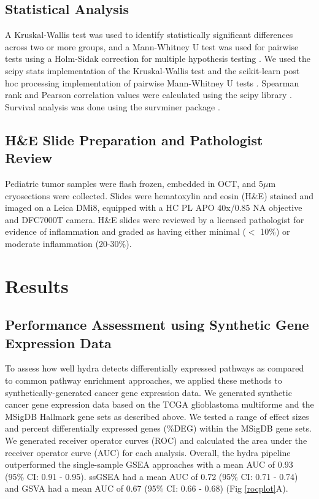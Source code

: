\documentclass[10pt,letterpaper]{article}
\begin{document}
\subsection*{Statistical Analysis}
A Kruskal-Wallis test was used to identify statistically significant differences across two or more groups, and a Mann-Whitney U test was used for pairwise tests using a Holm-Sidak correction for multiple hypothesis testing \cite{pedregosa2011scikit,jonesSciPyOpenSource2001}. We used the scipy \cite{2019arXiv190710121V} stats implementation of the Kruskal-Wallis test and the scikit-learn post hoc processing \cite{Terpilowski2019} implementation of pairwise Mann-Whitney U tests . Spearman rank and Pearson correlation values were calculated using the scipy library \cite{jonesSciPyOpenSource2001}. Survival analysis was done using the survminer package \cite{kassambaraSurvminerDrawingSurvival2019}. 

\subsection*{H\&E Slide Preparation and Pathologist Review}
Pediatric tumor samples were flash frozen, embedded in OCT, and 5$\mu$m cryosections were collected. Slides were hematoxylin and eosin (H\&E) stained and imaged on a Leica DMi8, equipped with a HC PL APO 40x/0.85 NA objective and DFC7000T camera. H\&E slides were reviewed by a licensed pathologist for evidence of inflammation and graded as having either minimal ($<$ 10\%) or moderate inflammation (20-30\%).

\section*{Results}
\subsection*{Performance Assessment using Synthetic Gene Expression Data}
To assess how well hydra detects differentially expressed pathways as compared to common pathway enrichment approaches, we applied these methods to synthetically-generated cancer gene expression data. We generated synthetic cancer gene expression data based on the TCGA glioblastoma multiforme and the MSigDB Hallmark gene sets as described above. We tested a range of effect sizes and percent differentially expressed genes (\%DEG) within the MSigDB gene sets. We generated receiver operator curves (ROC) and calculated the area under the receiver operator curve (AUC) for each analysis. Overall, the hydra pipeline outperformed the single-sample GSEA approaches with a mean AUC of 0.93 (95\% CI: 0.91 - 0.95). ssGSEA had a mean AUC of 0.72 (95\% CI: 0.71 - 0.74) and GSVA had a mean AUC of 0.67 (95\% CI: 0.66 - 0.68) (Fig \ref{rocplot}A).
\end{document}
